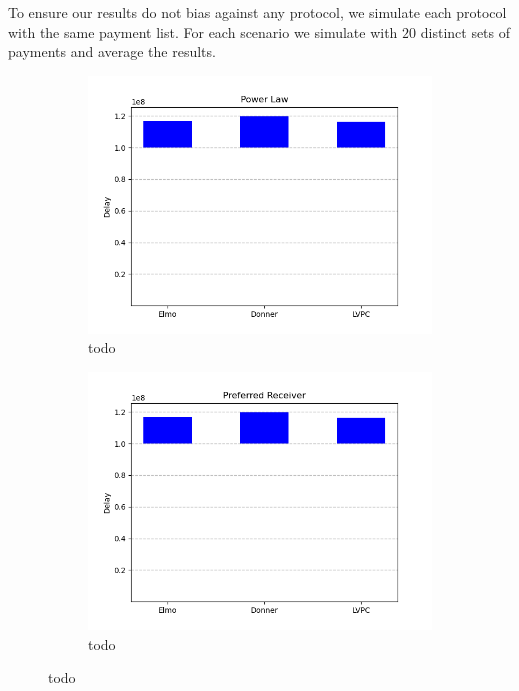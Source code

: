   To ensure our results do not bias against any protocol, we simulate each
  protocol with the same payment list. For each scenario we simulate with $20$
  distinct sets of payments and average the results.

  \begin{figure}
  \begin{subfigure}{.3293\textwidth}
  \includegraphics[width=\textwidth]{../simulation/Delays_power_law.png}
  \caption{todo}
  \label{graph:power-law:delays}
  \end{subfigure}
  \begin{subfigure}{.3293\textwidth}
  \includegraphics[width=\textwidth]{../simulation/Delays_preferred_receiver.png}
  \caption{todo}

\end{subfigure}
\end{figure}
